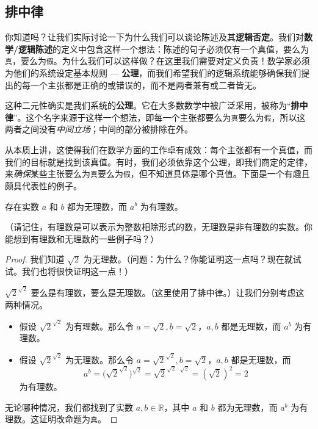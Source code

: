 \subsection{排中律}

你知道吗？让我们实际讨论一下为什么我们可以谈论陈述及其\textbf{逻辑否定}。我们对\textbf{数学/逻辑陈述}的定义中包含这样一个想法：陈述的句子必须仅有一个真值，要么为\verb|真|，要么为\verb|假|。为什么我们可以这样做？在这里我们需要对定义负责！数学家必须为他们的系统设定基本规则 --- \textbf{公理}，而我们希望我们的逻辑系统能够确保我们提出的每一个主张都是正确的或错误的，而不是两者兼有或二者皆无。

这种二元性确实是我们系统的\textbf{公理}。它在大多数数学中被广泛采用，被称为``\textbf{排中律}''。这个名字来源于这样一个想法，即每一个主张都要么为\verb|真|要么为\verb|假|，所以这两者之间没有\emph{中间立场}；中间的部分被排除在外。

从本质上讲，这使得我们在数学方面的工作卓有成效：每个主张都有一个真值，而我们的目标就是找到该真值。有时，我们必须依靠这个公理，即我们商定的定律，来\emph{确保}某些主张要么为\verb|真|要么为\verb|假|，但不知道具体是哪个真值。下面是一个有趣且颇具代表性的例子。

\begin{proposition}
    存在实数 $a$ 和 $b$ 都为无理数，而 $a^b$ 为有理数。
\end{proposition}

（请记住，有理数是可以表示为整数相除形式的数，无理数是非有理数的实数。你能想到有理数和无理数的一些例子吗？）

\begin{proof}
    我们知道 $\sqrt{2}$ 为无理数。（问题：为什么？你能证明这一点吗？现在就试试。我们也将很快证明这一点！）

    $\sqrt{2}^{\sqrt{2}}$ 要么是有理数，要么是无理数。（这里使用了排中律。）让我们分别考虑这两种情况。
    \begin{itemize}
        \item 假设 $\sqrt{2}^{\sqrt{2}}$ 为有理数。那么令 $a=\sqrt{2}, b=\sqrt{2}$，$a, b$ 都是无理数，而 $a^b$ 为有理数。
        \item 假设 $\sqrt{2}^{\sqrt{2}}$ 为无理数。那么令 $a=\sqrt{2}^{\sqrt{2}}, b=\sqrt{2}$，$a, b$ 都是无理数，而
        \[a^b = \big(\sqrt{2}^{\sqrt{2}}\big)^{\sqrt{2}} = \sqrt{2}^{\sqrt{2} \cdot \sqrt{2}} = (\sqrt{2})^2 = 2\]
        为有理数。
    \end{itemize}
    无论哪种情况，我们都找到了实数 $a, b \in \mathbb{R}$，其中 $a$ 和 $b$ 都为无理数，而 $a^b$ 为有理数。这证明改命题为\verb|真|。
\end{proof}

